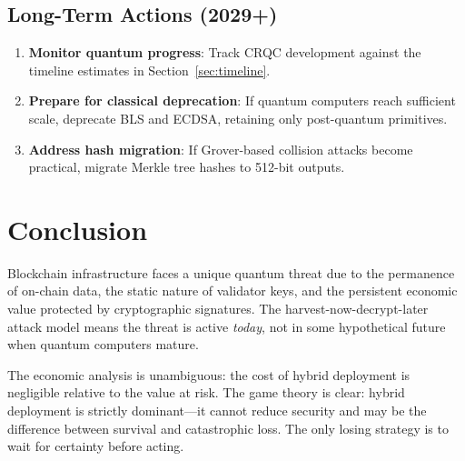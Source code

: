 \documentclass[11pt,a4paper]{article}
\begin{document}
\subsection{Long-Term Actions (2029+)}

\begin{enumerate}[leftmargin=2em]
  \item \textbf{Monitor quantum progress}: Track CRQC development against the
        timeline estimates in Section~\ref{sec:timeline}.
  \item \textbf{Prepare for classical deprecation}: If quantum computers reach
        sufficient scale, deprecate BLS and ECDSA, retaining only post-quantum
        primitives.
  \item \textbf{Address hash migration}: If Grover-based collision attacks become
        practical, migrate Merkle tree hashes to 512-bit outputs.
\end{enumerate}

\section{Conclusion}

Blockchain infrastructure faces a unique quantum threat due to the permanence of
on-chain data, the static nature of validator keys, and the persistent economic value
protected by cryptographic signatures. The harvest-now-decrypt-later attack model
means the threat is active \emph{today}, not in some hypothetical future when quantum
computers mature.

The economic analysis is unambiguous: the cost of hybrid deployment is negligible
relative to the value at risk. The game theory is clear: hybrid deployment is
strictly dominant---it cannot reduce security and may be the difference between
survival and catastrophic loss. The only losing strategy is to wait for certainty
before acting.
\end{document}
